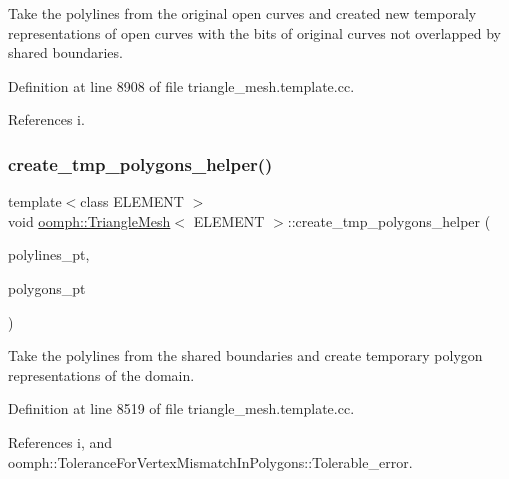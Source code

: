 Take the polylines from the original open curves and created new temporaly representations of open curves with the bits of original curves not overlapped by shared boundaries. 



Definition at line 8908 of file triangle\+\_\+mesh.\+template.\+cc.



References i.

\mbox{\label{classoomph_1_1TriangleMesh_a12e4d6af85176be0a050ca7b0644a69b}} 
\subsubsection{\texorpdfstring{create\+\_\+tmp\+\_\+polygons\+\_\+helper()}{create\_tmp\_polygons\_helper()}}
{\footnotesize\ttfamily template$<$class E\+L\+E\+M\+E\+NT $>$ \\
void \hyperlink{classoomph_1_1TriangleMesh}{oomph\+::\+Triangle\+Mesh}$<$ E\+L\+E\+M\+E\+NT $>$\+::create\+\_\+tmp\+\_\+polygons\+\_\+helper (\begin{DoxyParamCaption}\item[{\hyperlink{classoomph_1_1Vector}{Vector}$<$ \hyperlink{classoomph_1_1Vector}{Vector}$<$ \hyperlink{classoomph_1_1TriangleMeshPolyLine}{Triangle\+Mesh\+Poly\+Line} $\ast$$>$ $>$ \&}]{polylines\+\_\+pt,  }\item[{\hyperlink{classoomph_1_1Vector}{Vector}$<$ \hyperlink{classoomph_1_1TriangleMeshPolygon}{Triangle\+Mesh\+Polygon} $\ast$$>$ \&}]{polygons\+\_\+pt }\end{DoxyParamCaption})\hspace{0.3cm}{\ttfamily [protected]}}



Take the polylines from the shared boundaries and create temporary polygon representations of the domain. 



Definition at line 8519 of file triangle\+\_\+mesh.\+template.\+cc.



References i, and oomph\+::\+Tolerance\+For\+Vertex\+Mismatch\+In\+Polygons\+::\+Tolerable\+\_\+error.



